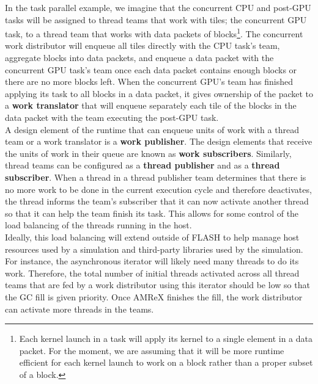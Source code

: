 \documentclass{article}
\begin{document}
In the task parallel example, we imagine that the concurrent CPU and post-GPU
tasks will be assigned to thread teams that work with tiles; the concurrent GPU
task, to a thread team that works with data packets of blocks\footnote{Each
kernel launch in a task will apply its kernel to a single element in a data packet.  For
the moment, we are assuming that it will be more runtime efficient for each
kernel launch to work on a block rather than a proper subset of a block.}.  The concurrent
work distributor will enqueue all tiles directly with the CPU task's team,
aggregate blocks into data packets, and enqueue a data packet with the concurrent
GPU task's team once each data packet contains enough blocks or there are no more
blocks left.  When the concurrent GPU's team has finished applying its task to
all blocks in a data packet, it gives ownership of the packet to a \textbf{work
translator} that will enqueue separately each tile of the blocks in the data
packet with the team executing the post-GPU task.\\

A design element of the runtime that can enqueue units of work with a thread
team or a work translator is a \textbf{work publisher}.  The design elements
that receive the units of work in their queue are known as \textbf{work
subscribers}.  Similarly, thread teams can be configured as a \textbf{thread
publisher} and as a \textbf{thread subscriber}.  When a thread in a thread
publisher team determines that there is no more work to be done in the current
execution cycle and therefore deactivates, the thread informs the team's
subscriber that it can now activate another thread so that it can help the team
finish its task.  This allows for some control of the load balancing of the
threads running in the host.\\

Ideally, this load balancing will extend outside of FLASH to help manage host
resources used by a simulation and third-party libraries used by the simulation.
For instance, the asynchronous iterator will likely need many threads to do its
work.  Therefore, the total number of initial threads activated across all
thread teams that are fed by a work distributor using this iterator should be
low so that the GC fill is given priority.  Once AMReX finishes the fill, the
work distributor can activate more threads in the teams.\\
\end{document}
